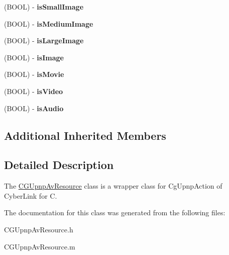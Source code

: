 \begin{DoxyCompactItemize}
\item 
\hypertarget{interface_c_g_upnp_av_resource_a0edf2fb09a171c5de785447edbbcd317}{(B\-O\-O\-L) -\/ {\bfseries is\-Small\-Image}}\label{interface_c_g_upnp_av_resource_a0edf2fb09a171c5de785447edbbcd317}

\item 
\hypertarget{interface_c_g_upnp_av_resource_a867a0823bc499f11f5ab7b1d9b3e8e9e}{(B\-O\-O\-L) -\/ {\bfseries is\-Medium\-Image}}\label{interface_c_g_upnp_av_resource_a867a0823bc499f11f5ab7b1d9b3e8e9e}

\item 
\hypertarget{interface_c_g_upnp_av_resource_a02cd0cac4bcdc48875fa64f459333840}{(B\-O\-O\-L) -\/ {\bfseries is\-Large\-Image}}\label{interface_c_g_upnp_av_resource_a02cd0cac4bcdc48875fa64f459333840}

\item 
\hypertarget{interface_c_g_upnp_av_resource_a935e8bb420f838c0f183b18563c3a32e}{(B\-O\-O\-L) -\/ {\bfseries is\-Image}}\label{interface_c_g_upnp_av_resource_a935e8bb420f838c0f183b18563c3a32e}

\item 
\hypertarget{interface_c_g_upnp_av_resource_ab20a7199634376cb375aa1b39e8d70c1}{(B\-O\-O\-L) -\/ {\bfseries is\-Movie}}\label{interface_c_g_upnp_av_resource_ab20a7199634376cb375aa1b39e8d70c1}

\item 
\hypertarget{interface_c_g_upnp_av_resource_a0f0b21a8f06ff478a55a426222942c4d}{(B\-O\-O\-L) -\/ {\bfseries is\-Video}}\label{interface_c_g_upnp_av_resource_a0f0b21a8f06ff478a55a426222942c4d}

\item 
\hypertarget{interface_c_g_upnp_av_resource_a61dfb8e6f17cca0c0a0c8717e140b297}{(B\-O\-O\-L) -\/ {\bfseries is\-Audio}}\label{interface_c_g_upnp_av_resource_a61dfb8e6f17cca0c0a0c8717e140b297}

\end{DoxyCompactItemize}
\subsection*{Additional Inherited Members}


\subsection{Detailed Description}
The \hyperlink{interface_c_g_upnp_av_resource}{C\-G\-Upnp\-Av\-Resource} class is a wrapper class for Cg\-Upnp\-Action of Cyber\-Link for C. 

The documentation for this class was generated from the following files\-:\begin{DoxyCompactItemize}
\item 
C\-G\-Upnp\-Av\-Resource.\-h\item 
C\-G\-Upnp\-Av\-Resource.\-m\end{DoxyCompactItemize}
